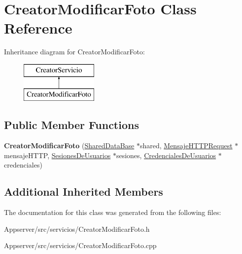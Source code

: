\hypertarget{classCreatorModificarFoto}{}\section{Creator\+Modificar\+Foto Class Reference}
\label{classCreatorModificarFoto}
Inheritance diagram for Creator\+Modificar\+Foto\+:\begin{figure}[H]
\begin{center}
\leavevmode
\includegraphics[height=2.000000cm]{classCreatorModificarFoto}
\end{center}
\end{figure}
\subsection*{Public Member Functions}
\begin{DoxyCompactItemize}
\item 
{\bfseries Creator\+Modificar\+Foto} (\hyperlink{classSharedDataBase}{Shared\+Data\+Base} $\ast$shared, \hyperlink{classMensajeHTTPRequest}{Mensaje\+H\+T\+T\+P\+Request} $\ast$mensaje\+H\+T\+TP, \hyperlink{classSesionesDeUsuarios}{Sesiones\+De\+Usuarios} $\ast$sesiones, \hyperlink{classCredencialesDeUsuarios}{Credenciales\+De\+Usuarios} $\ast$credenciales)\hypertarget{classCreatorModificarFoto_ad6030abac72b7f2facb579a764d5abab}{}\label{classCreatorModificarFoto_ad6030abac72b7f2facb579a764d5abab}

\end{DoxyCompactItemize}
\subsection*{Additional Inherited Members}


The documentation for this class was generated from the following files\+:\begin{DoxyCompactItemize}
\item 
Appserver/src/servicios/Creator\+Modificar\+Foto.\+h\item 
Appserver/src/servicios/Creator\+Modificar\+Foto.\+cpp\end{DoxyCompactItemize}
